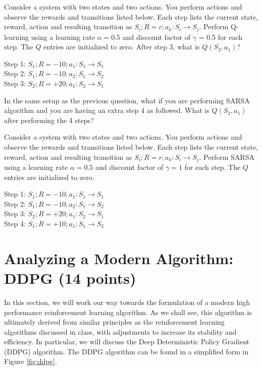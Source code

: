 \documentclass[letterpaper,12pt,addpoints]{exam}
\begin{document}
\begin{questions}
\question[4] Consider a system with two states and two actions. You perform actions and observe the
rewards and transitions listed below. Each step lists the current state, reward, action and resulting transition as $S_i;R=r;a_k:S_i \rightarrow S_j$. Perform Q-learning using a learning rate $\alpha=0.5$ and discount factor of $\gamma$ = 0.5 for each step. The $Q$ entries are initialized to zero. After step 3, what is $Q(S_2, a_1)$?

Step 1: $S_1;R=-10;a_1:S_1 \rightarrow S_1$ \\
Step 2: $S_1;R=-10;a_2:S_1 \rightarrow S_2$ \\
Step 3: $S_2;R=+20;a_1:S_2 \rightarrow S_1$

\begin{solution}[2in]
\end{solution}

\question[4] In the same setup as the previous question, what if you are performing SARSA algorithm and you are having an extra step 4 as followed. What is $Q(S_2, a_1)$ after performing the 4 steps? 

Consider a system with two states and two actions. You perform actions and observe the
rewards and transitions listed below. Each step lists the current state, reward, action and resulting transition as $S_i;R=r;a_k:S_i \rightarrow S_j$. Perform SARSA using a learning rate $\alpha=0.5$ and discount factor of $\gamma=1$ for each step. The $Q$ entries are initialized to zero.


Step 1: $S_1;R=-10;a_1:S_1 \rightarrow S_1$ \\
Step 2: $S_1;R=-10;a_2:S_1 \rightarrow S_2$ \\
Step 3: $S_2;R=+20;a_1:S_2 \rightarrow S_1$ \\
Step 4: $S_1;R=+10;a_1:S_1 \rightarrow S_2$


\end{questions}

\newpage

\section{Analyzing a Modern Algorithm: DDPG (14 points)}
In this section, we will work our way towards the formulation of a modern high performance reinforcement learning algorithm. As we shall see, this algorithm is ultimately derived from similar principles as the reinforcement learning algorithms discussed in class, with adjustments to increase its stability and efficiency.
In particular, we will discuss the Deep Deterministic Policy Gradient (DDPG) algorithm. The DDPG algorithm can be found in a simplified form in Figure \ref{fig:ddpg}.
\end{document}
